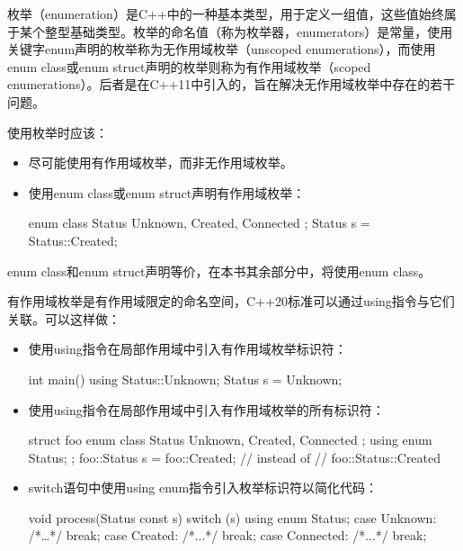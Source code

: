 
枚举（enumeration）是C++中的一种基本类型，用于定义一组值，这些值始终属于某个整型基础类型。枚举的命名值（称为枚举器，enumerators）是常量，使用关键字enum声明的枚举称为无作用域枚举（unscoped enumerations），而使用enum class或enum struct声明的枚举则称为有作用域枚举（scoped enumerations）。后者是在C++11中引入的，旨在解决无作用域枚举中存在的若干问题。


使用枚举时应该：

\begin{itemize}
\item
尽可能使用有作用域枚举，而非无作用域枚举。

\item
使用enum class或enum struct声明有作用域枚举：

\begin{cpp}
enum class Status { Unknown, Created, Connected };
Status s = Status::Created;
\end{cpp}
\end{itemize}

\begin{myNotic}
enum class和enum struct声明等价，在本书其余部分中，将使用enum class。
\end{myNotic}

有作用域枚举是有作用域限定的命名空间，C++20标准可以通过using指令与它们关联。可以这样做：

\begin{itemize}
\item
使用using指令在局部作用域中引入有作用域枚举标识符：

\begin{cpp}
int main()
{
    using Status::Unknown;
    Status s = Unknown;
}
\end{cpp}

\item
使用using指令在局部作用域中引入有作用域枚举的所有标识符：

\begin{cpp}
struct foo
{
    enum class Status { Unknown, Created, Connected };
    using enum Status;
};
foo::Status s = foo::Created; // instead of
// foo::Status::Created
\end{cpp}

\item
switch语句中使用using enum指令引入枚举标识符以简化代码：

\begin{cpp}
void process(Status const s)
{
    switch (s)
    {
        using enum Status;
        case Unknown:   /*…*/ break;
        case Created:   /*...*/ break;
        case Connected: /*...*/ break;
    }
}
\end{cpp}
\end{itemize}

